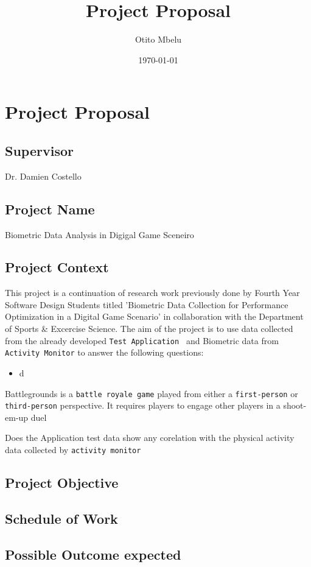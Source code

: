 \documentclass{report}
\title{Project Proposal}
\author{Otito Mbelu}
\date{\today}
\begin{document}
\maketitle

\chapter{Project Proposal}
    \section*{Supervisor}
    Dr. Damien Costello
    \section*{Project Name}
    Biometric Data Analysis in Digigal Game Sceneiro
    \section{Project Context}
    This project is a continuation of research work previously done by Fourth Year Software Design Students titled 'Biometric Data Collection for
    Performance Optimization in a Digital Game Scenario' in collaboration with the Department of Sports \& Excercise Science.
    The aim of the project is to use data collected from the already developed {\tt Test Application } and Biometric data from {\tt Activity Monitor}
    to answer the following questions: 
    \begin{itemize}
        \item{d}
    \end{itemize}

    Battlegrounds is a {\tt battle royale game} played from either a {\tt first-person} or {\tt third-person} perspective. 
    It requires players to engage other players in a shoot-em-up duel

    Does the Application test data show any corelation with the physical activity data collected by {\tt activity monitor}
    
    \section{Project Objective}
    \section{Schedule of Work}
    \section{Possible Outcome expected}
\end{document}
